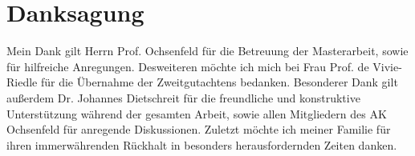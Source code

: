 \chapter{Danksagung}
Mein Dank gilt Herrn Prof. Ochsenfeld für die Betreuung der Masterarbeit, sowie für hilfreiche Anregungen.
Desweiteren möchte ich mich bei Frau Prof. de Vivie-Riedle für die Übernahme der Zweitgutachtens bedanken.
Besonderer Dank gilt außerdem Dr. Johannes Dietschreit für die freundliche und konstruktive Unterstützung während der gesamten Arbeit, sowie allen Mitgliedern des AK Ochsenfeld für anregende Diskussionen.
Zuletzt möchte ich meiner Familie für ihren immerwährenden Rückhalt in besonders herausfordernden Zeiten danken.
